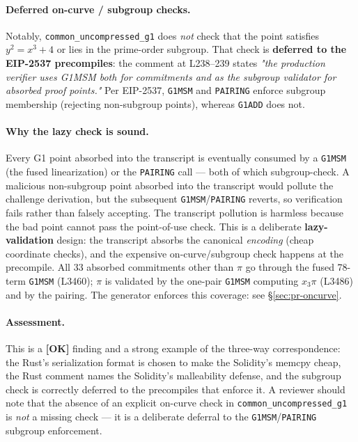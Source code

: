 \paragraph{Deferred on-curve / subgroup checks.} Notably,
\texttt{common\_\allowbreak{}uncompressed\_\allowbreak{}g1} does \emph{not} check that the
point satisfies $y^2 = x^3 + 4$ or lies in the prime-order subgroup.
That check is \textbf{deferred to the EIP-2537 precompiles}: the
comment at L238--239 states \emph{"the production verifier uses
G1MSM both for commitments and as the subgroup validator for
absorbed proof points."} Per EIP-2537, \texttt{G1MSM} and
\texttt{PAIRING} enforce subgroup membership (rejecting
non-subgroup points), whereas \texttt{G1ADD} does not.

\paragraph{Why the lazy check is sound.} Every G1 point absorbed
into the transcript is eventually consumed by a \texttt{G1MSM} (the
fused linearization) or the \texttt{PAIRING} call --- both of which
subgroup-check. A malicious non-subgroup point absorbed into the
transcript would pollute the challenge derivation, but the
subsequent \texttt{G1MSM}/\texttt{PAIRING} reverts, so verification
fails rather than falsely accepting. The transcript pollution is
harmless because the bad point cannot pass the point-of-use check.
This is a deliberate \textbf{lazy-validation} design: the transcript
absorbs the canonical \emph{encoding} (cheap coordinate checks),
and the expensive on-curve/subgroup check happens at the
precompile. All 33 absorbed commitments other than $\pi$ go
through the fused 78-term \texttt{G1MSM} (L3460); $\pi$ is validated by the one-pair
\texttt{G1MSM} computing $x_3\pi$ (L3486) and by the pairing. The
generator enforces this coverage: see
\S\ref{sec:pr-oncurve}.

\paragraph{Assessment.} This is a
\textcolor{tracegreen}{\textbf{[OK]}} finding and a strong example
of the three-way correspondence: the Rust's serialization format is
chosen to make the Solidity's memcpy cheap, the Rust comment names
the Solidity's malleability defense, and the subgroup check is
correctly deferred to the precompiles that enforce it. A reviewer
should note that the absence of an explicit on-curve check in
\texttt{common\_\allowbreak{}uncompressed\_\allowbreak{}g1} is \emph{not} a missing check ---
it is a deliberate deferral to the \texttt{G1MSM}/\texttt{PAIRING}
subgroup enforcement.

